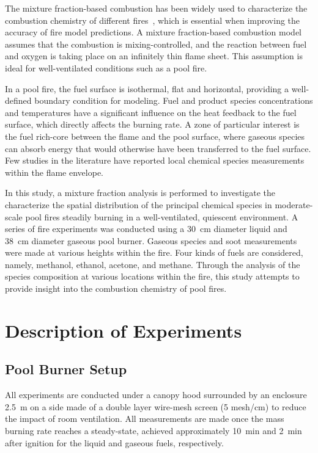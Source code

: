 \documentclass[preprint,review,12pt]{elsarticle}
\begin{document}
The mixture fraction-based combustion has been widely used to characterize the combustion chemistry of different fires~\cite{Bilger1977,Peters1984,Floyd2001,Hamins1987,Sivathanu1990}, which is essential when improving the accuracy of fire model predictions. A mixture fraction-based combustion model assumes that the combustion is mixing-controlled, and the reaction between fuel and oxygen is taking place on an infinitely thin flame sheet. This assumption is ideal for well-ventilated conditions such as a pool fire. 

In a pool fire, the fuel surface is isothermal, flat and horizontal, providing a well-defined boundary condition for modeling. Fuel and product species concentrations and temperatures have a significant influence on the heat feedback to the fuel surface, which directly affects the burning rate. A zone of particular interest is the fuel rich-core between the flame and the pool surface, where gaseous species can absorb energy that would otherwise have been transferred to the fuel surface. Few studies in the literature have reported local chemical species measurements within the flame envelope.

In this study, a mixture fraction analysis is performed to investigate the characterize the spatial distribution of the principal chemical species in moderate-scale pool fires steadily burning in a well-ventilated, quiescent environment. A series of fire experiments was conducted using a 30~cm diameter liquid and 38~cm diameter gaseous pool burner. Gaseous species and soot measurements were made at various heights within the fire. Four kinds of fuels are considered, namely, methanol, ethanol, acetone, and methane. Through the analysis of the species composition at various locations within the fire, this study attempts to provide insight into the combustion chemistry of pool fires. 


\section{Description of Experiments}
\label{sec:Experiments}

\subsection{Pool Burner Setup}
\label{ssec:Pool_Burner_Setup}
All experiments are conducted under a canopy hood surrounded by an enclosure 2.5~m on a side made of a double layer wire-mesh screen (5 mesh/cm) to reduce the impact of room ventilation. All measurements are made once the mass burning rate reaches a steady-state, achieved approximately 10~min and 2~min after ignition for the liquid and gaseous fuels, respectively.
\end{document}
